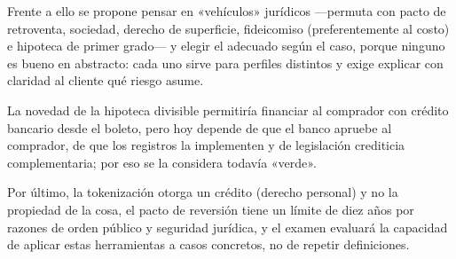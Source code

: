 \documentclass[12pt,oneside]{book}
\begin{document}
Frente a ello se propone pensar en «vehículos» jurídicos —permuta con pacto de retroventa, sociedad, derecho de superficie, fideicomiso (preferentemente al costo) e hipoteca de primer grado— y elegir el adecuado según el caso, porque ninguno es bueno en abstracto: cada uno sirve para perfiles distintos y exige explicar con claridad al cliente qué riesgo asume.

La novedad de la hipoteca divisible permitiría financiar al comprador con crédito bancario desde el boleto, pero hoy depende de que el banco apruebe al comprador, de que los registros la implementen y de legislación crediticia complementaria; por eso se la considera todavía «verde».

Por último, la tokenización otorga un crédito (derecho personal) y no la propiedad de la cosa, el pacto de reversión tiene un límite de diez años por razones de orden público y seguridad jurídica, y el examen evaluará la capacidad de aplicar estas herramientas a casos concretos, no de repetir definiciones.
\end{document}
